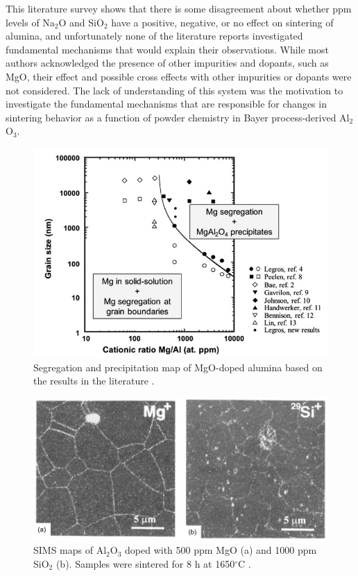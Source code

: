 This literature survey shows that there is some disagreement about whether ppm levels of Na$_{2}$O and SiO$_{2}$ have a positive, negative, or no effect on sintering of alumina, and unfortunately none of the literature reports investigated fundamental mechanisms that would explain their observations. While most authors acknowledged the presence of other impurities and dopants, such as MgO, their effect and possible cross effects with other impurities or dopants were not considered. The lack of understanding of this system was the motivation to investigate the fundamental mechanisms that are responsible for changes in sintering behavior as a function of powder chemistry in Bayer process-derived Al$_{2}$O$_{3}$.

\newpage
\begin{figure}[H]
	\centering
	\includegraphics{Chapter-1/Figures/Figure1.png}
	\caption{Segregation and precipitation map of MgO-doped alumina based on the results in the literature \cite{Zuo2013}.}
	\label{Ch1-figure:Figure1}
\end{figure}

\newpage
\begin{figure}[H]
	\centering
	\includegraphics{Chapter-1/Figures/Figure2.png}
	\caption{SIMS maps of Al$_{2}$O$_{3}$ doped with 500 ppm MgO (a) and 1000 ppm SiO$_{2}$ (b). Samples were sintered for 8 h at 1650$^{\circ}$C \cite{Gavrilov1999}.}
	\label{Ch1-figure:Figure2}
\end{figure}

